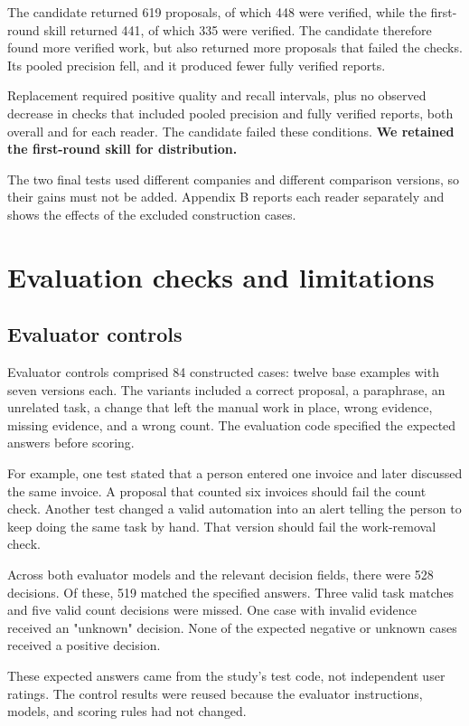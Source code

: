 \documentclass[11pt]{article}
\begin{document}
The candidate returned 619 proposals, of which 448 were verified, while the first-round skill returned 441, of which 335 were verified. The candidate therefore found more verified work, but also returned more proposals that failed the checks. Its pooled precision fell, and it produced fewer fully verified reports.

Replacement required positive quality and recall intervals, plus no observed decrease in checks that included pooled precision and fully verified reports, both overall and for each reader. The candidate failed these conditions. \textbf{We retained the first-round skill for distribution.}

The two final tests used different companies and different comparison versions, so their gains must not be added. Appendix B reports each reader separately and shows the effects of the excluded construction cases.

\section{Evaluation checks and limitations}
\subsection{Evaluator controls}
Evaluator controls comprised 84 constructed cases: twelve base examples with seven versions each. The variants included a correct proposal, a paraphrase, an unrelated task, a change that left the manual work in place, wrong evidence, missing evidence, and a wrong count. The evaluation code specified the expected answers before scoring.

For example, one test stated that a person entered one invoice and later discussed the same invoice. A proposal that counted six invoices should fail the count check. Another test changed a valid automation into an alert telling the person to keep doing the same task by hand. That version should fail the work-removal check.

Across both evaluator models and the relevant decision fields, there were 528 decisions. Of these, 519 matched the specified answers. Three valid task matches and five valid count decisions were missed. One case with invalid evidence received an "unknown" decision. None of the expected negative or unknown cases received a positive decision.

These expected answers came from the study's test code, not independent user ratings. The control results were reused because the evaluator instructions, models, and scoring rules had not changed.
\end{document}
